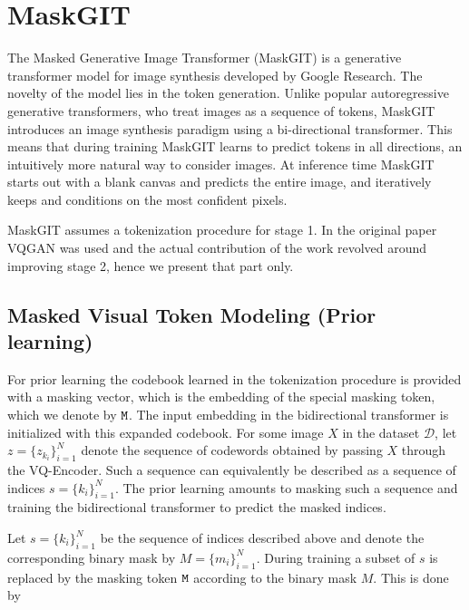 \documentclass[../../thesis.tex]{subfiles}
\begin{document}

\section{MaskGIT}

The Masked Generative Image Transformer (MaskGIT)\cite{chang2022maskgit} is a generative transformer model for image synthesis developed by Google Research. The novelty of the model lies in the token generation. Unlike popular autoregressive generative transformers, who treat images as a sequence of tokens, MaskGIT introduces an image synthesis paradigm using a bi-directional transformer. This means that during training MaskGIT learns to predict tokens in all directions, an intuitively more natural way to consider images. At inference time MaskGIT starts out with a blank canvas and predicts the entire image, and iteratively keeps and conditions on the most confident pixels.\newline

MaskGIT assumes a tokenization procedure for stage 1. In the original paper \cite{chang2022maskgit} VQGAN \cite{VQGAN} was used and the actual contribution of the work revolved around improving stage 2, hence we present that part only. 

\subsection{Masked Visual Token Modeling (Prior learning)}

For prior learning the codebook learned in the tokenization procedure is provided with a masking vector, which is the embedding of the special masking token, which we denote by $\texttt{M}$. The input embedding in the bidirectional transformer is initialized with this expanded codebook. For some image $X$ in the dataset $\mathcal{D}$, let $z = \{z_{k_i}\}_{i=1}^N$ denote the sequence of codewords obtained by passing $X$ through the VQ-Encoder. Such a sequence can equivalently be described as a sequence of indices $s = \{k_i\}_{i=1}^N$. The prior learning amounts to masking such a sequence and training the bidirectional transformer to predict the masked indices.
\newline

Let $s = \{k_i\}_{i=1}^N$ be the sequence of indices described above and denote the corresponding binary mask by $M = \{m_i\}_{i=1}^N$. During training a subset of $s$ is replaced by the masking token $\texttt{M}$ according to the binary mask $M$. This is done by 
\end{document}

